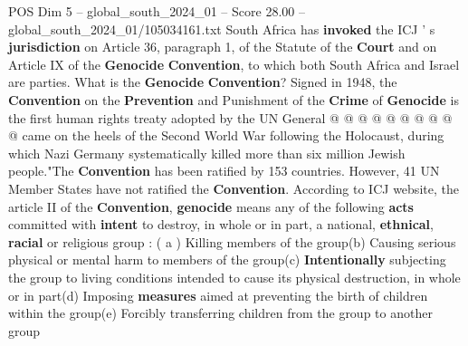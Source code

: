 \begin{textsample}{POS Dim 5 – global\_south\_2024\_01 – Score 28.00 – global\_south\_2024\_01/105034161.txt}
South Africa has \textbf{invoked} the ICJ ' s \textbf{jurisdiction} on Article 36, paragraph 1, of the Statute of the \textbf{Court} and on Article IX of the \textbf{Genocide} \textbf{Convention}, to which both South Africa and Israel are parties.
What is the \textbf{Genocide} \textbf{Convention}?
Signed in 1948, the \textbf{Convention} on the \textbf{Prevention} and Punishment of the \textbf{Crime} of \textbf{Genocide} is the first human rights treaty adopted by the UN General @ @ @ @ @ @ @ @ @ @ came on the heels of the Second World War following the Holocaust, during which Nazi Germany systematically killed more than six million Jewish people."The \textbf{Convention} has been ratified by 153 countries.
However, 41 UN Member States have not ratified the \textbf{Convention}.
According to ICJ website, the article II of the \textbf{Convention}, \textbf{genocide} means any of the following \textbf{acts} committed with \textbf{intent} to destroy, in whole or in part, a national, \textbf{ethnical}, \textbf{racial} or religious group : ( a ) Killing members of the group(b) Causing serious physical or mental harm to members of the group(c) \textbf{Intentionally} subjecting the group to living conditions intended to cause its physical destruction, in whole or in part(d) Imposing \textbf{measures} aimed at preventing the birth of children within the group(e) Forcibly transferring children from the group to another group

\end{textsample}
